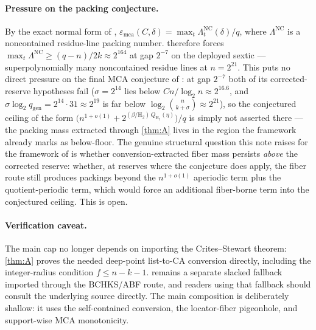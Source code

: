 \documentclass[11pt]{article}
\theoremstyle{definition}
\theoremstyle{remark}
\newcommand{\emca}{\varepsilon_{\mathrm{mca}}}
\newcommand{\Hb}{\mathrm{H}_2}
\begin{document}
\paragraph{Pressure on the packing conjecture.}
By the exact normal form of \cite{Cho26b}, $\emca(C,\delta)=\max_t\Lambda^{\mathrm{NC}}_t(\delta)/q$, where $\Lambda^{\mathrm{NC}}$ is a noncontained residue-line packing number.  therefore forces $\max_t\Lambda^{\mathrm{NC}}\ge(q-n)/2k\approx2^{164}$ at gap $2^{-7}$ on the deployed sextic --- superpolynomially many noncontained residue lines at $n=2^{21}$. This puts no direct pressure on the final MCA conjecture of \cite[Conj.\ ``Final floor- and quotient-corrected MCA asymptotic'']{Cho26b}: at gap $2^{-7}$ both of its corrected-reserve hypotheses fail ($\sigma=2^{14}$ lies below $Cn/\log_2n\approx2^{16.6}$, and $\sigma\log_2 q_{\mathrm{gen}}=2^{14}\cdot31\approx2^{19}$ is far below $\log_2\binom n{k+\sigma}\approx2^{21}$), so the conjectured ceiling of the form $\bigl(n^{1+o(1)}+2^{(\beta/\Hb)\,Q_{\Hb}(\eta)}\bigr)/q$ is simply not asserted there --- the packing mass extracted through \cref{thm:A} lives in the region the framework already marks as below-floor. The genuine structural question this note raises for the framework of \cite{Cho26b} is whether conversion-extracted fiber mass persists \emph{above} the corrected reserve: whether, at reserves where the conjecture does apply, the fiber route still produces packings beyond the $n^{1+o(1)}$ aperiodic term plus the quotient-periodic term, which would force an additional fiber-borne term into the conjectured ceiling. This is open.

\paragraph{Verification caveat.}
The main cap no longer depends on importing the Crites--Stewart theorem: \cref{thm:A} proves the needed deep-point list-to-CA conversion directly, including the integer-radius condition $f\le n-k-1$.   remains a separate slacked fallback imported through the BCHKS/ABF route, and readers using that fallback should consult the underlying source directly.  The main composition is deliberately shallow: it uses the self-contained conversion, the locator-fiber pigeonhole, and support-wise MCA monotonicity.
\end{document}
